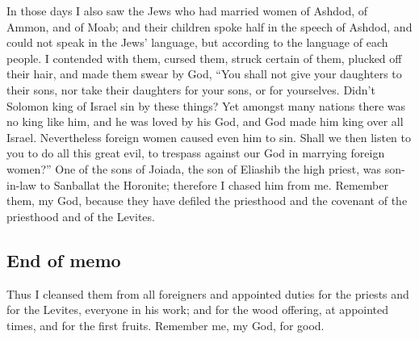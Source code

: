  In those days I also saw the Jews who had married women
of Ashdod, of Ammon, and of Moab;  and their children
spoke half in the speech of Ashdod, and could not speak in the Jews'
language, but according to the language of each people. 
I contended with them, cursed them, struck certain of them, plucked off
their hair, and made them swear by God, ``You shall not give your
daughters to their sons, nor take their daughters for your sons, or for
yourselves.  Didn't Solomon king of Israel sin by these
things? Yet amongst many nations there was no king like him, and he was
loved by his God, and God made him king over all Israel. Nevertheless
foreign women caused even him to sin.  Shall we then
listen to you to do all this great evil, to trespass against our God in
marrying foreign women?''  One of the sons of Joiada, the
son of Eliashib the high priest, was son-in-law to Sanballat the
Horonite; therefore I chased him from me.  Remember them,
my God, because they have defiled the priesthood and the covenant of the
priesthood and of the Levites.

\hypertarget{end-of-memo}{%
\subsection{End of memo}\label{end-of-memo}}

 Thus I cleansed them from all foreigners and appointed
duties for the priests and for the Levites, everyone in his work;
 and for the wood offering, at appointed times, and for
the first fruits. Remember me, my God, for good.
